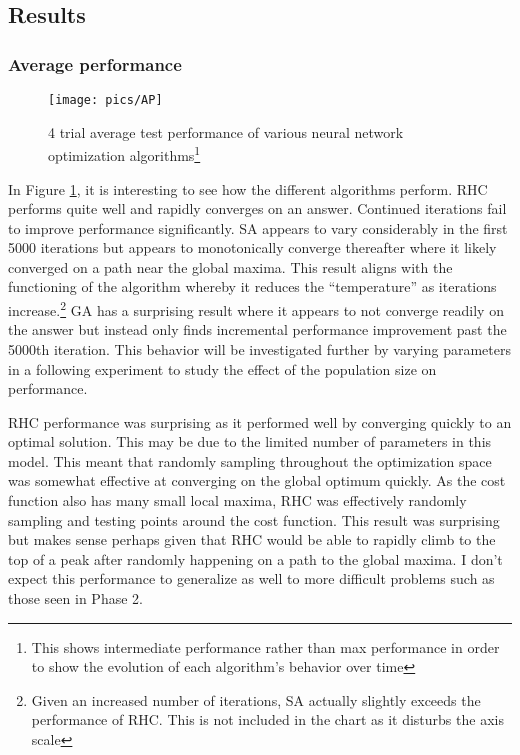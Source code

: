 \documentclass[12pt]{article}
\begin{document}
\subsection{Results}

\subsubsection{Average performance}
\begin{figure}[h!]
    \texttt{[image: pics/AP]}
    \caption{4 trial average test performance of various neural network optimization algorithms\footnote{This shows intermediate performance rather than max performance in order to show the evolution of each algorithm's behavior over time}}
    \label{fig:ap}
\end{figure}

In Figure \ref{fig:ap}, it is interesting to see how the different algorithms perform. RHC performs quite well and rapidly converges on an answer. Continued iterations fail to improve performance significantly. SA appears to vary considerably in the first 5000 iterations but appears to monotonically converge thereafter where it likely converged on a path near the global maxima. This result aligns with the functioning of the algorithm whereby it reduces the “temperature” as iterations increase.\footnote{Given an increased number of iterations, SA actually slightly exceeds the performance of RHC. This is not included in the chart as it disturbs the axis scale}  GA has a surprising result where it appears to not converge readily on the answer but instead only finds incremental performance improvement past the 5000th iteration. This behavior will be investigated further by varying parameters in a following experiment to study the effect of the population size on performance.

RHC performance was surprising as it performed well by converging quickly to an optimal solution. This may be due to the limited number of parameters in this model. This meant that randomly sampling throughout the optimization space was somewhat effective at converging on the global optimum quickly. As the cost function also has many small local maxima, RHC was effectively randomly sampling and testing points around the cost function. This result was surprising but makes sense perhaps given that RHC would be able to rapidly climb to the top of a peak after randomly happening on a path to the global maxima. I don't expect this performance to generalize as well to more difficult problems such as those seen in Phase 2.
\end{document}
